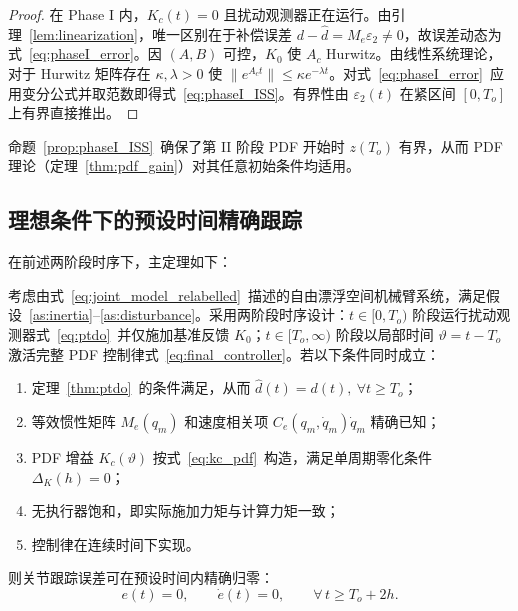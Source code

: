 \begin{proof}
  在 Phase I 内，\(K_c(t)=0\) 且扰动观测器正在运行。由引理~\ref{lem:linearization}，唯一区别在于补偿误差 \(d-\hat d = M_e\varepsilon_2 \neq 0\)，故误差动态为式~\eqref{eq:phaseI_error}。因 \((A,B)\) 可控，\(K_0\) 使 \(A_c\) Hurwitz。由线性系统理论，对于 Hurwitz 矩阵存在 \(\kappa,\lambda>0\) 使 \(\|e^{A_c t}\|\le \kappa e^{-\lambda t}\)。对式~\eqref{eq:phaseI_error}~应用变分公式并取范数即得式~\eqref{eq:phaseI_ISS}。有界性由 \(\varepsilon_2(t)\) 在紧区间 \([0,T_o]\) 上有界直接推出。
\end{proof}

命题~\ref{prop:phaseI_ISS}~确保了第 II 阶段 PDF 开始时 \(z(T_o)\) 有界，从而 PDF 理论（定理~\ref{thm:pdf_gain}）对其任意初始条件均适用。

\subsection{理想条件下的预设时间精确跟踪}

在前述两阶段时序下，主定理如下：

\begin{theorem}[预设时间精确跟踪]\label{thm:main_ideal}
  考虑由式~\eqref{eq:joint_model_relabelled}~描述的自由漂浮空间机械臂系统，满足假设~\ref{as:inertia}--\ref{as:disturbance}。采用两阶段时序设计：\(t\in[0,T_o)\) 阶段运行扰动观测器式~\eqref{eq:ptdo}~并仅施加基准反馈 \(K_0\)；\(t\in[T_o,\infty)\) 阶段以局部时间 \(\vartheta=t-T_o\) 激活完整 PDF 控制律式~\eqref{eq:final_controller}。若以下条件同时成立：
  \begin{enumerate}
    \item[(A)] 定理~\ref{thm:ptdo}~的条件满足，从而 \(\hat d(t)=d(t),\ \forall t\ge T_o\)；
    \item[(B)] 等效惯性矩阵 \(M_e(q_m)\) 和速度相关项 \(C_e(q_m,\dot q_m)\dot q_m\) 精确已知；
    \item[(C)] PDF 增益 \(K_c(\vartheta)\) 按式~\eqref{eq:kc_pdf}~构造，满足单周期零化条件 \(\Delta_K(h)=0\)；
    \item[(D)] 无执行器饱和，即实际施加力矩与计算力矩一致；
    \item[(E)] 控制律在连续时间下实现。
  \end{enumerate}
  则关节跟踪误差可在预设时间内精确归零：
  \begin{equation}
  e(t)=0,\qquad \dot e(t)=0,\qquad \forall\,t\ge T_o+2h.
  \label{eq:main_ideal_result}
  \end{equation}
\end{theorem}

